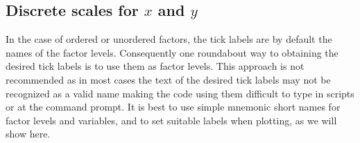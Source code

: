 \documentclass[krantz2]{krantz}\usepackage{knitr}%
\begin{document}
\subsection{Discrete scales for $x$ and $y$}

In the case of ordered or unordered factors, the tick labels are by default the names of the factor levels. Consequently one roundabout way to obtaining the desired tick labels is to use them as factor levels. This approach is not recommended as in most cases the text of the desired tick labels may not be recognized as a valid name making the code using them difficult to type in scripts or at the command prompt. It is best to use simple mnemonic short names for factor levels and variables, and to set suitable labels when plotting, as we will show here.
\end{document}
